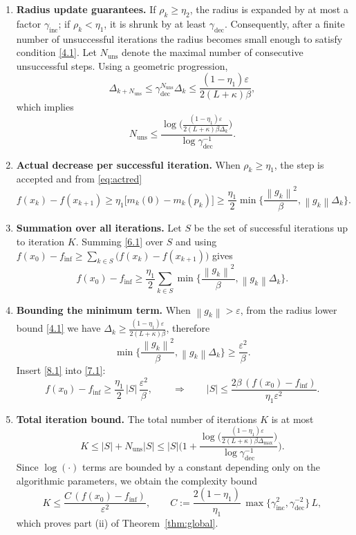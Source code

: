 \documentclass{article}
\newcommand{\norm}[1]{\left\lVert#1\right\rVert}
\begin{document}
\begin{enumerate}
\item[Step 5.] \textbf{Radius update guarantees.}  
If $\rho_k\ge\eta_2$, the radius is expanded by at most a factor
$\gamma_{\text{inc}}$; if $\rho_k<\eta_1$, it is shrunk by at least
$\gamma_{\text{dec}}$.  Consequently, after a finite number of
unsuccessful iterations the radius becomes small enough to satisfy
condition \eqref{4.1}.  Let $N_{\text{uns}}$ denote the maximal number of
consecutive unsuccessful steps.  Using a geometric progression,
\[
\Delta_{k+N_{\text{uns}}}
\le \gamma_{\text{dec}}^{N_{\text{uns}}}\Delta_k
\le \frac{(1-\eta_1)\varepsilon}{2(L+\kappa)\beta},
\]
which implies
\[
N_{\text{uns}}\le
\frac{\log\!\big(\frac{(1-\eta_1)\varepsilon}
                 {2(L+\kappa)\beta\Delta_k}\big)}
     {\log\gamma_{\text{dec}}^{-1}}.
\tag{5.1}
\]

\item[Step 6.] \textbf{Actual decrease per successful iteration.}
When $\rho_k\ge\eta_1$, the step is accepted and from \eqref{eq:actred}
\[
f(x_k)-f(x_{k+1})
\ge \eta_1\big[m_k(0)-m_k(p_k)\big]
\ge \frac{\eta_1}{2}\min\!\Big\{\frac{\norm{g_k}^{2}}{\beta},
                                 \norm{g_k}\Delta_k\Big\}.
\tag{6.1}
\]

\item[Step 7.] \textbf{Summation over all iterations.}
Let $S$ be the set of successful iterations up to iteration $K$.
Summing \eqref{6.1} over $S$ and using $f(x_{0})-f_{\inf}\ge
\sum_{k\in S}\big(f(x_k)-f(x_{k+1})\big)$ gives
\[
f(x_{0})-f_{\inf}
\ge \frac{\eta_1}{2}\sum_{k\in S}
      \min\!\Big\{\frac{\norm{g_k}^{2}}{\beta},
                  \norm{g_k}\Delta_k\Big\}.
\tag{7.1}
\]

\item[Step 8.] \textbf{Bounding the minimum term.}
When $\norm{g_k}>\varepsilon$, from the radius lower bound
\eqref{4.1} we have $\Delta_k\ge
\frac{(1-\eta_1)\varepsilon}{2(L+\kappa)\beta}$, therefore
\[
\min\!\Big\{\frac{\norm{g_k}^{2}}{\beta},
            \norm{g_k}\Delta_k\Big\}
\ge \frac{\varepsilon^{2}}{\beta}.
\tag{8.1}
\]
Insert \eqref{8.1} into \eqref{7.1}:
\[
f(x_{0})-f_{\inf}
\ge \frac{\eta_1}{2}\,|S|\,\frac{\varepsilon^{2}}{\beta},
\qquad\Longrightarrow\qquad
|S|\le \frac{2\beta\,(f(x_{0})-f_{\inf})}{\eta_1\varepsilon^{2}}.
\tag{8.2}
\]

\item[Step 9.] \textbf{Total iteration bound.}
The total number of iterations $K$ is at most
\[
K \le |S| + N_{\text{uns}}|S|
\le |S|\Big(1+\frac{\log\big(\frac{(1-\eta_1)\varepsilon}
                 {2(L+\kappa)\beta\Delta_{\max}}\big)}
                 {\log\gamma_{\text{dec}}^{-1}}\Big).
\]
Since $\log(\cdot)$ terms are bounded by a constant depending only on the
algorithmic parameters, we obtain the complexity bound
\[
K \le
\frac{C\,(f(x_{0})-f_{\inf})}{\varepsilon^{2}},
\qquad
C:=\frac{2(1-\eta_1)}{\eta_1}\,
     \max\!\big\{\gamma_{\text{inc}}^{2},\gamma_{\text{dec}}^{-2}\big\}\,L,
\]
which proves part (ii) of Theorem~\ref{thm:global}.


\end{enumerate}
\end{document}
